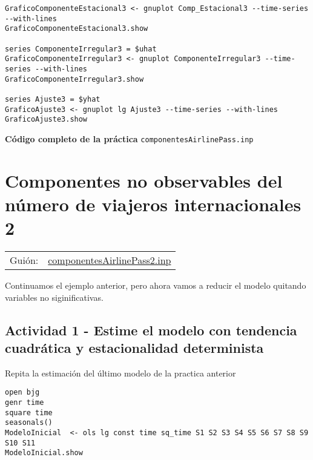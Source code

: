 \documentclass[11pt]{article}
\begin{document}
\begin{enumerate}
\begin{itemize}
{\begin{verbatim}
GraficoComponenteEstacional3 <- gnuplot Comp_Estacional3 --time-series --with-lines
GraficoComponenteEstacional3.show

series ComponenteIrregular3 = $uhat
GraficoComponenteIrregular3 <- gnuplot ComponenteIrregular3 --time-series --with-lines
GraficoComponenteIrregular3.show

series Ajuste3 = $yhat
GraficoAjuste3 <- gnuplot lg Ajuste3 --time-series --with-lines
GraficoAjuste3.show
\end{verbatim}
}
\end{itemize}


\vspace{10pt}
\noindent
\textbf{Código completo de la práctica} \texttt{componentesAirlinePass.inp}
\vspace{10pt}

\clearpage
\end{enumerate}


\section{Componentes no observables del número de viajeros internacionales 2}
\label{sec:org3d954b6}
\begin{center}
\begin{tabular}{ll}
Guión: & \href{https://github.com/mbujosab/Ectr/tree/master/Practicas/Gretl/scripts/componentesAirlinePass2.inp}{componentesAirlinePass2.inp}\\[0pt]
\end{tabular}
\end{center}

Continuamos el ejemplo anterior, pero ahora vamos a reducir el modelo
quitando variables no siginificativas.

\subsection{Actividad 1 - Estime el modelo con tendencia cuadrática y estacionalidad determinista}
\label{sec:org09775a3}

Repita la estimación del último modelo de la practica anterior

{\vspace{0pt} \footnotesize \color{gray!70!black}
\begin{verbatim}
open bjg
genr time
square time
seasonals()
ModeloInicial  <- ols lg const time sq_time S1 S2 S3 S4 S5 S6 S7 S8 S9 S10 S11
ModeloInicial.show
\end{verbatim}
}
\end{document}
